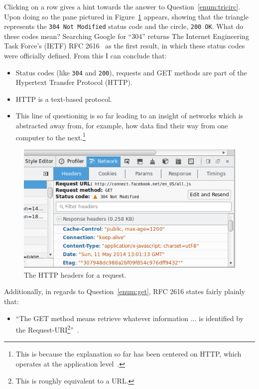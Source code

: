 \documentclass[11pt,a4paper]{report}
\begin{document}
	Clicking on a row gives a hint towards the answer to Question~\ref{enum:tricirc}. Upon doing so the pane pictured in Figure~\ref{fig:tricirc} appears, showing that the triangle represents the \verb|304 Not Modified| status code and the circle, \verb|200 OK|. What do these codes mean? Searching Google for ``304'' returns The Internet Engineering Task Force's (IETF) RFC 2616~\cite{http-rfc} as the first result, in which these status codes were officially defined. From this I can conclude that:
	\begin{itemize}
		\item Status codes (like \verb|304| and \verb|200|), requests and GET methods are part of the Hypertext Transfer Protocol (HTTP).
		\item HTTP is a text-based protocol.
		\item This line of questioning is so far leading to an insight of networks which is abstracted away from, for example, how data find their way from one computer to the next.\footnote{This is because the explanation so far has been centered on HTTP, which operates at the application level~\cite[Section~1.1]{http-rfc}.} %
	\end{itemize}
	
	\begin{figure}
		\includegraphics[width=\textwidth]{tricirc.png}
		\caption{The HTTP headers for a request.}
		\label{fig:tricirc}
	\end{figure}
	
	Additionally, in regards to Question~\ref{enum:get}, RFC 2616 states fairly plainly that:
	\begin{itemize}
		\item ``The GET method means retrieve whatever information ... is identified by the Request-URI\footnote{This is roughly equivalent to a URL.}''~\cite[Section~9.3]{http-rfc}.
	\end{itemize}
	
\end{document}
